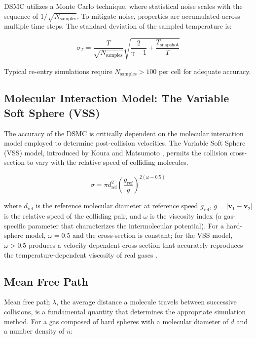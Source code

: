 DSMC utilizes a Monte Carlo technique, where statistical noise scales with the sequence of $1/\sqrt{N_{\text{samples}}}$. To mitigate noise, properties are accumulated across multiple time steps. The standard deviation of the sampled temperature is:

\begin{equation}
    \sigma_T = \frac{T}{\sqrt{N_{\text{samples}}}} \sqrt{\frac{2}{\gamma - 1} + \frac{T_{\text{snapshot}}}{T}}
    \label{eq:dsmc_noise}
\end{equation}

\noindent Typical re-entry simulations require $N_{\text{samples}} > 100$ per cell for adequate accuracy.

\subsection{Molecular Interaction Model: The Variable Soft Sphere (VSS)}

The accuracy of the DSMC is critically dependent on the molecular interaction model employed to determine post-collision velocities. The Variable Soft Sphere (VSS) model, introduced by Koura and Matsumoto \cite{bird1994molecular}, permits the collision cross-section to vary with the relative speed of colliding molecules.

\begin{equation}
    \sigma = \pi d_{\text{ref}}^2 \left( \frac{g_{\text{ref}}}{g} \right)^{2(\omega - 0.5)}
    \label{eq:vss_cross_section}
\end{equation}

\noindent where $d_{\text{ref}}$ is the reference molecular diameter at reference speed $g_{\text{ref}}$, $g = |\mathbf{v}_1 - \mathbf{v}_2|$ is the relative speed of the colliding pair, and $\omega$ is the viscosity index (a gas-specific parameter that characterizes the intermolecular potential). For a hard-sphere model, $\omega = 0.5$ and the cross-section is constant; for the VSS model, $\omega > 0.5$ produces a velocity-dependent cross-section that accurately reproduces the temperature-dependent viscosity of real gases \cite{bird1994molecular}.

\subsection{Mean Free Path}

Mean free path $\lambda$, the average distance a molecule travels between successive collisions, is a fundamental quantity that determines the appropriate simulation method. For a gas composed of hard spheres with a molecular diameter of $d$ and a number density of $n$:

